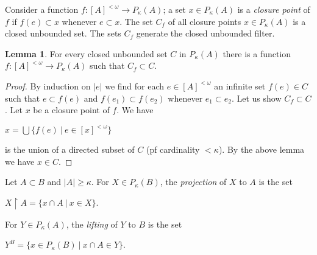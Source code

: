 \documentclass[8pt]{article}
\theoremstyle{definition}
\theoremstyle{definition}
\theoremstyle{definition}
\theoremstyle{definition}
\theoremstyle{definition}
\theoremstyle{definition}
\theoremstyle{definition}
\theoremstyle{definition}
\newtheorem{lemma}{Lemma}[section]
\theoremstyle{definition}
\theoremstyle{definition}
\theoremstyle{definition}
\theoremstyle{definition}
\theoremstyle{definition}
\theoremstyle{definition}
\theoremstyle{question}
\begin{document}
Consider a function $f : [A]^{< \omega} \to P_{\kappa}(A)$; a set $x \in P_{\kappa}(A)$ is a 
\emph{closure point} of $f$ if $f(e) \subset x$ whenever $e \subset x$. The set $C_f$ of all closure points
$x \in P_{\kappa}(A)$ is a closed unbounded set. The sets $C_f$ generate the closed unbounded filter.

\begin{lemma}
  For every closed unbounded set $C$ in $P_{\kappa}(A)$ there
  is a function $f : [A]^{< \omega} \to P_{\kappa}(A)$ such that $C_f \subset C$.
\end{lemma}

\begin{proof}
  By induction on $|e|$ we find for each $e \in [A]^{< \omega}$ an infinite set 
  $f(e) \in C$ such that $e \subset f(e)$ and $f(e_1) \subset f(e_2)$ whenever $e_1 \subset e_2$.
  Let us show $C_f \subset C$. Let $x$ be a closure point of $f$. We have
  \begin{center}
    $x = \bigcup \{ f(e) \: | \: e \in [x]^{< \omega }\}$
  \end{center}
  is the union of a directed subset of $C$ (pf cardinality $< \kappa$).
  By the above lemma we have $x \in C$.
\end{proof}

Let $A \subset B$ and $|A| \geq \kappa$. For $X \in P_{\kappa}(B)$, the 
\emph{projection} of $X$ to $A$ is the set
\begin{center}
  $X \upharpoonright A = \{ x \cap A \: | \: x \in X\}$.
\end{center}
For $Y \in P_{\kappa}(A)$, the \emph{lifting} of $Y$ to $B$ is the set
\begin{center}
  $Y^B = \{ x \in P_{\kappa}(B) \: | \: x \cap A \in Y \}$.
\end{center}



\end{document}
